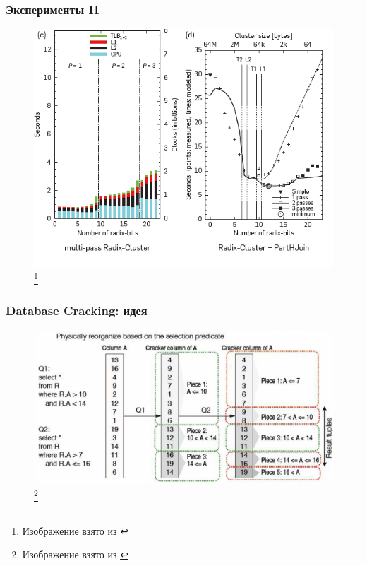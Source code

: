 \documentclass{beamer}
\begin{document}
\begin{frame}
\frametitle{Эксперименты II}

\begin{figure}[htb]
\includegraphics[width=\textwidth,height=0.750\textheight,keepaspectratio]{joinexp2.png} 
\footnote{\tiny{Изображение взято из \cite{Boncz2008}}}
\end{figure}

\end{frame}

\begin{frame}
\frametitle{Database Cracking: идея}

\begin{figure}[htb]
\includegraphics[width=\textwidth,height=0.750\textheight,keepaspectratio]{cracking.png} 
\footnote{\tiny{Изображение взято из \cite{Harizopoulos2009}}}
\end{figure}

\end{frame}
\end{document}
